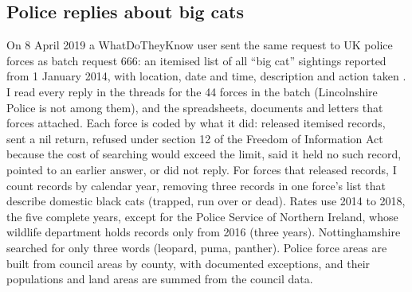 \documentclass[11pt,a4paper]{article}
\begin{document}
\subsection{Police replies about big cats}
On 8 April 2019 a WhatDoTheyKnow user sent the same request to UK police forces as batch request 666: an itemised list of all ``big cat'' sightings reported from 1 January 2014, with location, date and time, description and action taken \citep{wdtk2019}. I read every reply in the threads for the 44 forces in the batch (Lincolnshire Police is not among them), and the spreadsheets, documents and letters that forces attached. Each force is coded by what it did: released itemised records, sent a nil return, refused under section 12 of the Freedom of Information Act because the cost of searching would exceed the limit, said it held no such record, pointed to an earlier answer, or did not reply. For forces that released records, I count records by calendar year, removing three records in one force's list that describe domestic black cats (trapped, run over or dead). Rates use 2014 to 2018, the five complete years, except for the Police Service of Northern Ireland, whose wildlife department holds records only from 2016 (three years). Nottinghamshire searched for only three words (leopard, puma, panther). Police force areas are built from council areas by county, with documented exceptions, and their populations and land areas are summed from the council data.
\end{document}
